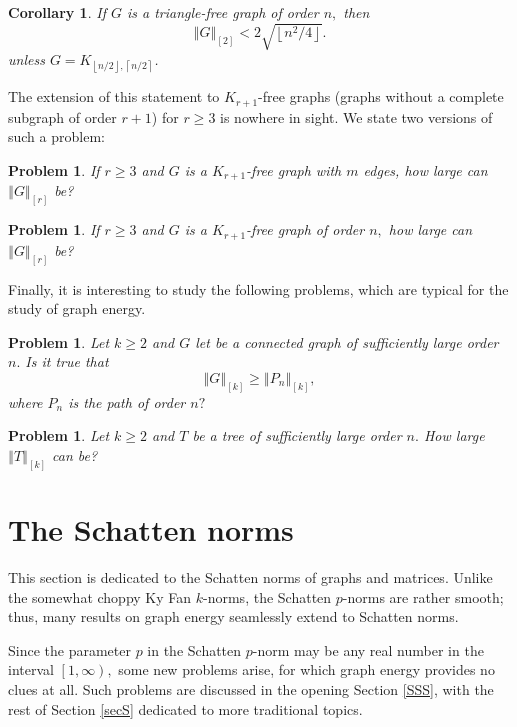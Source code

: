 \documentclass[12pt]{article}%
\newtheorem{corollary}[theorem]{Corollary}
\newtheorem{problem}[theorem]{Problem}
\begin{document}
\begin{corollary}
If $G$ is a triangle-free graph of order $n,$ then%
\[
\left\Vert G\right\Vert _{\left[  2\right]  }<2\sqrt{\left\lfloor
n^{2}/4\right\rfloor }.
\]
unless $G=K_{\left\lfloor n/2\right\rfloor ,\left\lceil n/2\right\rceil }$.
\end{corollary}

The extension of this statement to $K_{r+1}$-free graphs (graphs without a
complete subgraph of order $r+1$) for $r\geq3$ is nowhere in sight. We state
two versions of such a problem:

\begin{problem}
If $r\geq3$ and $G$ is a $K_{r+1}$-free graph with $m$ edges, how large can
$\left\Vert G\right\Vert _{\left[  r\right]  }$ be?
\end{problem}

\begin{problem}
If $r\geq3$ and $G$ is a $K_{r+1}$-free graph of order $n,$ how large can
$\left\Vert G\right\Vert _{\left[  r\right]  }$ be?
\end{problem}

Finally, it is interesting to study the following problems, which are typical
for the study of graph energy.

\begin{problem}
Let $k\geq2$ and $G$ let be a connected graph of sufficiently large order $n.$
Is it true that
\[
\left\Vert G\right\Vert _{\left[  k\right]  }\geq\left\Vert P_{n}\right\Vert
_{\left[  k\right]  },
\]
where $P_{n}$ is the path of order $n?$
\end{problem}

\begin{problem}
Let $k\geq2$ and $T$ be a tree of sufficiently large order $n.$ How large
$\left\Vert T\right\Vert _{\left[  k\right]  }$ can be?
\end{problem}

\section{\label{secS}The Schatten norms}

This section is dedicated to the Schatten norms of graphs and matrices. Unlike
the somewhat choppy Ky Fan $k$-norms, the Schatten $p$-norms are rather
smooth; thus, many results on graph energy seamlessly extend to Schatten
norms.\medskip

Since the parameter $p$ in the Schatten $p$-norm may be any real number in the
interval $\left[  1,\infty\right)  ,$ some new problems arise, for which graph
energy provides no clues at all. Such problems are discussed in the opening
Section \ref{SSS}, with the rest of Section \ref{secS} dedicated to more
traditional topics.\medskip
\end{document}
